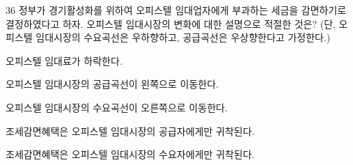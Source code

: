 \begin{question}{36}
정부가 경기활성화를 위하여 오피스텔 임대업자에게 부과하는 세금을 감면하기로 결정하였다고 하자. 오피스텔 임대시장의 변화에 대한 설명으로 적절한 것은? (단, 오피스텔 임대시장의 수요곡선은 우하향하고, 공급곡선은 우상향한다고 가정한다.)
\begin{choices}
  \item 오피스텔 임대료가 하락한다.
  \item 오피스텔 임대시장의 공급곡선이 왼쪽으로 이동한다.
  \item 오피스텔 임대시장의 수요곡선이 오른쪽으로 이동한다.
  \item 조세감면혜택은 오피스텔 임대시장의 공급자에게만 귀착된다.
  \item 조세감면혜택은 오피스텔 임대시장의 수요자에게만 귀착된다.
\end{choices}
\end{question}
